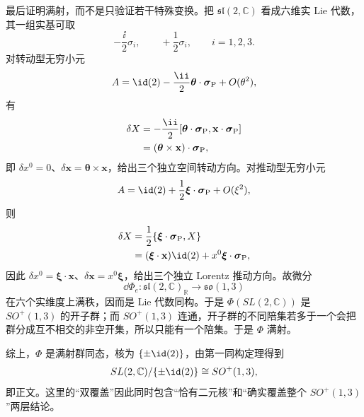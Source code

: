 \begin{derivation}
最后证明满射，而不是只验证若干特殊变换。把 $\mathfrak{sl}(2,\mathbb C)$ 看成六维实 Lie 代数，其一组实基可取
\begin{equation*}
 -\frac{\ii}{2}\sigma_i,
 \qquad
 +\frac12\sigma_i,
 \qquad i=1,2,3.
\end{equation*}
对转动型无穷小元
\begin{equation*}
 A=\id(2)-\frac{\ii}{2}\boldsymbol\theta\cdot\boldsymbol\sigma_{\rm P}
 +O(\theta^2),
\end{equation*}
有
\begin{align*}
 \delta X
 &=-\frac{\ii}{2}
 [\boldsymbol\theta\cdot\boldsymbol\sigma_{\rm P},
   \mathbf x\cdot\boldsymbol\sigma_{\rm P}]\\
 &=(\boldsymbol\theta\times\mathbf x)\cdot\boldsymbol\sigma_{\rm P},
\end{align*}
即 $\delta x^0=0$、$\delta\mathbf x=\boldsymbol\theta\times\mathbf x$，给出三个独立空间转动方向。对推动型无穷小元
\begin{equation*}
 A=\id(2)+\frac12\boldsymbol\xi\cdot\boldsymbol\sigma_{\rm P}
 +O(\xi^2),
\end{equation*}
则
\begin{align*}
 \delta X
 &=\frac12\{\boldsymbol\xi\cdot\boldsymbol\sigma_{\rm P},X\}\\
 &=(\boldsymbol\xi\cdot\mathbf x)\id(2)
 +x^0\boldsymbol\xi\cdot\boldsymbol\sigma_{\rm P},
\end{align*}
因此 $\delta x^0=\boldsymbol\xi\cdot\mathbf x$、$\delta\mathbf x=x^0\boldsymbol\xi$，给出三个独立 Lorentz 推动方向。故微分
\begin{equation*}
 \dd\Phi_e:\mathfrak{sl}(2,\mathbb C)_{\mathbb R}
 \longrightarrow\mathfrak{so}(1,3)
\end{equation*}
在六个实维度上满秩，因而是 Lie 代数同构。于是 $\Phi(SL(2,\mathbb C))$ 是 $SO^+(1,3)$ 的开子群；而 $SO^+(1,3)$ 连通，开子群的不同陪集若多于一个会把群分成互不相交的非空开集，所以只能有一个陪集。于是 $\Phi$ 满射。

综上，$\Phi$ 是满射群同态，核为 $\{\pm\id(2)\}$，由第一同构定理得到
\begin{equation*}
 SL(2,\mathbb C)/\{\pm\id(2)\}
 \cong SO^+(1,3),
\end{equation*}
即正文。这里的“双覆盖”因此同时包含“恰有二元核”和“确实覆盖整个 $SO^+(1,3)$”两层结论。
\end{derivation}
